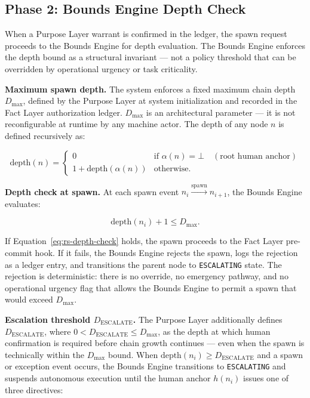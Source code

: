 \subsection{Phase 2: Bounds Engine Depth Check}

When a Purpose Layer warrant is confirmed in the ledger, the spawn request proceeds to the Bounds Engine for depth evaluation. The Bounds Engine enforces the depth bound as a structural invariant — not a policy threshold that can be overridden by operational urgency or task criticality.

\medskip
\noindent\textbf{Maximum spawn depth.} The system enforces a fixed maximum chain depth $D_{\max}$, defined by the Purpose Layer at system initialization and recorded in the Fact Layer authorization ledger. $D_{\max}$ is an architectural parameter — it is not reconfigurable at runtime by any machine actor. The depth of any node $n$ is defined recursively as:

\begin{equation}
\text{depth}(n) =
\begin{cases}
0 & \text{if } \alpha(n) = \bot \quad (\text{root human anchor}) \\[6pt]
1 + \text{depth}(\alpha(n)) & \text{otherwise}.
\end{cases}
\label{eq:rs-depth}
\end{equation}

\medskip
\noindent\textbf{Depth check at spawn.} At each spawn event $n_i \xrightarrow{\text{spawn}} n_{i+1}$, the Bounds Engine evaluates:

\begin{equation}
\text{depth}(n_i) + 1 \leq D_{\max}.
\label{eq:rs-depth-check}
\end{equation}

If Equation~\ref{eq:rs-depth-check} holds, the spawn proceeds to the Fact Layer pre-commit hook. If it fails, the Bounds Engine rejects the spawn, logs the rejection as a ledger entry, and transitions the parent node to \texttt{ESCALATING} state. The rejection is deterministic: there is no override, no emergency pathway, and no operational urgency flag that allows the Bounds Engine to permit a spawn that would exceed $D_{\max}$.

\medskip
\noindent\textbf{Escalation threshold $D_{\text{ESCALATE}}$.} The Purpose Layer additionally defines $D_{\text{ESCALATE}}$, where $0 < D_{\text{ESCALATE}} \leq D_{\max}$, as the depth at which human confirmation is required before chain growth continues — even when the spawn is technically within the $D_{\max}$ bound. When $\text{depth}(n_i) \geq D_{\text{ESCALATE}}$ and a spawn or exception event occurs, the Bounds Engine transitions to \texttt{ESCALATING} and suspends autonomous execution until the human anchor $h(n_i)$ issues one of three directives:

